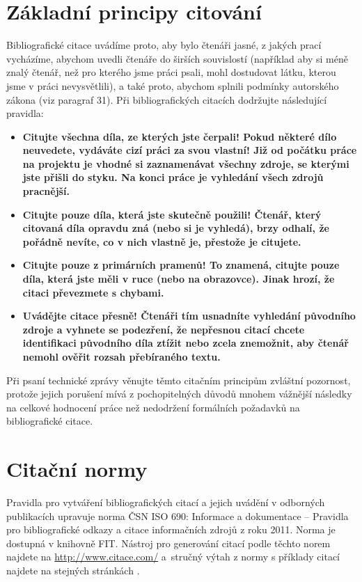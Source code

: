 \section{Základní principy citování}

Bibliografické citace uvádíme proto, aby bylo čtenáři jasné, z jakých prací vycházíme, abychom uvedli čtenáře do širších souvislostí (například aby si méně znalý čtenář, než pro kterého jsme práci psali, mohl dostudovat látku, kterou jsme v práci nevysvětlili), a také proto, abychom splnili podmínky autorského zákona (viz paragraf 31). Při bibliografických citacích dodržujte následující pravidla:

\begin{itemize}
  \item{\bf Citujte všechna díla, ze kterých jste čerpali! \rm Pokud některé dílo neuvedete, vydáváte cizí práci za svou vlastní! Již od počátku práce na projektu je vhodné si zaznamenávat všechny zdroje, se kterými jste přišli do styku. Na konci práce je vyhledání všech zdrojů pracnější.}
  \item{\bf Citujte pouze díla, která jste skutečně použili! \rm Čtenář, který citovaná díla opravdu zná (nebo si je vyhledá), brzy odhalí, že pořádně nevíte, co v nich vlastně je, přestože je citujete.}
  \item{\bf Citujte pouze z primárních pramenů! \rm To znamená, citujte pouze díla, která jste měli v ruce (nebo na obrazovce). Jinak hrozí, že citaci převezmete s chybami.}
  \item{\bf Uvádějte citace přesně! \rm Čtenáři tím usnadníte vyhledání původního zdroje a vyhnete se podezření, že nepřesnou citací chcete identifikaci původního díla ztížit nebo zcela znemožnit, aby čtenář nemohl ověřit rozsah přebíraného textu.}
\end{itemize}

Při psaní technické zprávy věnujte těmto citačním principům zvláštní pozornost, protože jejich porušení mívá z pochopitelných důvodů mnohem vážnější následky na celkové hodnocení práce než nedodržení formálních požadavků na bibliografické citace.

\section{Citační normy}

Pravidla pro vytváření bibliografických citací a jejich uvádění v odborných publikacích upravuje norma ČSN ISO 690: Informace a dokumentace -- Pravidla pro bibliografické odkazy a citace informačních zdrojů z roku 2011. Norma je dostupná v knihovně FIT. Nástroj pro generování citací podle těchto norem najdete na \url{http://www.citace.com/} a~stručný výtah z normy s příklady citací najdete na stejných stránkách \cite{biblio}.

